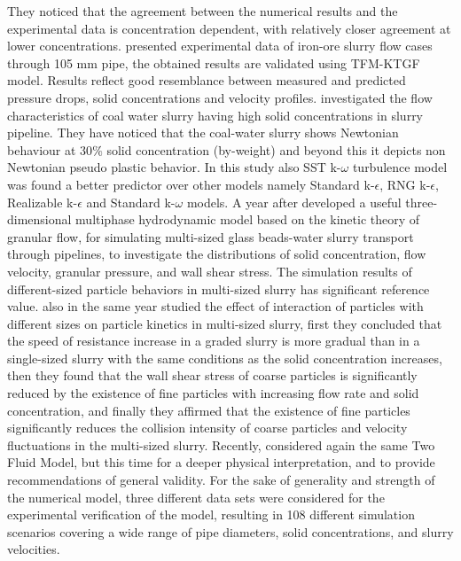 \documentclass[11pt]{report}
\begin{document}
%
They noticed that the agreement between the numerical results and the experimental data is  concentration dependent, with relatively closer agreement at lower concentrations. 
%
\citet{kumar2019experimental} presented experimental data of iron-ore slurry flow cases through 105 mm pipe, the obtained results are validated using TFM-KTGF model. 
%
Results reflect good resemblance between measured and predicted pressure drops, solid concentrations and velocity profiles.
%
 \citet{singh2020computational} investigated the flow characteristics of coal water slurry having high solid concentrations in slurry pipeline. 
 They have noticed that the coal-water slurry shows Newtonian behaviour at 30$\%$ solid concentration (by-weight) and beyond this it depicts non Newtonian pseudo plastic behavior.
  In this study also  SST k-$\omega$ turbulence model was found a better predictor over other models namely Standard k-$\epsilon$, RNG k-$\epsilon$, Realizable k-$\epsilon$ and Standard k-$\omega$ models. 
  A year after \citet{Li-2018a} developed a useful three-dimensional multiphase hydrodynamic model based on the kinetic theory of granular flow, 
  for simulating multi-sized glass beads-water slurry transport through pipelines, to investigate the distributions of solid concentration, flow velocity, granular pressure, and wall shear stress. 
  The simulation results of different-sized particle behaviors in multi-sized slurry has significant reference value. 
  \citet{Li-2018b} also in the same year studied the effect of interaction of particles with different sizes on particle kinetics in multi-sized slurry, 
  first they concluded that the speed of resistance increase in a graded slurry is more gradual than in a single-sized slurry with the same conditions as the solid concentration increases, 
  then they found that the wall shear stress of coarse particles is significantly reduced by the existence of fine particles with increasing flow rate and solid concentration, and finally they affirmed that the existence of fine particles significantly reduces the collision intensity of coarse particles and velocity fluctuations in the multi-sized slurry. Recently, \citet{Messa-2020} considered again the same Two Fluid Model, but this time for a  deeper physical interpretation, and to provide recommendations of general validity. For the sake of generality and strength of the numerical model, three different data sets were considered for the experimental verification of the model, resulting in 108 different simulation scenarios covering a wide range of pipe diameters, solid concentrations, and slurry velocities.
\end{document}
